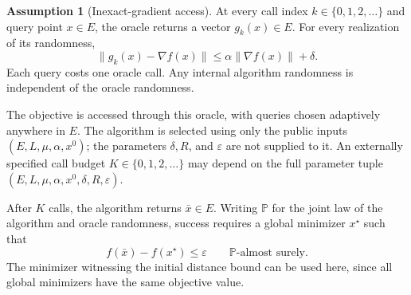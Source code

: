 \documentclass[10pt]{article}
\theoremstyle{definition}
\newtheorem{assumption}{Assumption}
\begin{document}
\begin{assumption}[Inexact-gradient access]
At every call index $k\in\{0,1,2,\ldots\}$ and query point $x\in E$, the oracle returns a vector $g_k(x)\in E$. For every realization of its randomness,
\[
\|g_k(x)-\nabla f(x)\|
\leq\alpha\|\nabla f(x)\|+\delta.
\]
Each query costs one oracle call. Any internal algorithm randomness is independent of the oracle randomness.
\end{assumption}

The objective is accessed through this oracle, with queries chosen adaptively anywhere in $E$. The algorithm is selected using only the public inputs $(E,L,\mu,\alpha,x^0)$; the parameters $\delta,R$, and $\varepsilon$ are not supplied to it. An externally specified call budget $K\in\{0,1,2,\ldots\}$ may depend on the full parameter tuple $(E,L,\mu,\alpha,x^0,\delta,R,\varepsilon)$.

After $K$ calls, the algorithm returns $\bar{x}\in E$. Writing $\mathbb{P}$ for the joint law of the algorithm and oracle randomness, success requires a global minimizer $x^\star$ such that
\[
f(\bar{x})-f(x^\star)\leq\varepsilon
\qquad\mathbb{P}\text{-almost surely}.
\]
The minimizer witnessing the initial distance bound can be used here, since all global minimizers have the same objective value.
\end{document}
